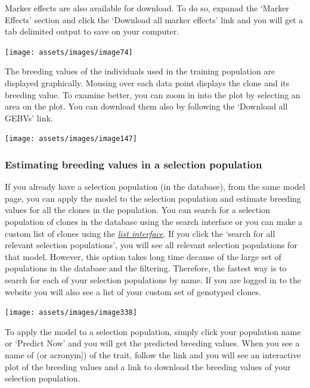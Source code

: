 \documentclass[
  12pt,
]{book}
\begin{document}
Marker effects are also available for download. To do so, expanad the `Marker Effects' section and click the `Download all marker effects' link and you will get a tab delimited output to save on your computer.

\begin{center}\texttt{[image: assets/images/image74]} \end{center}

The breeding values of the individuals used in the training population are displayed graphically. Mousing over each data point displays the clone and its breeding value. To examine better, you can zoom in into the plot by selecting an area on the plot. You can download them also by following the `Download all GEBVs' link.

\begin{center}\texttt{[image: assets/images/image147]} \end{center}

\hypertarget{estimating-breeding-values-in-a-selection-population}{%
\subsubsection*{Estimating breeding values in a selection population}\label{estimating-breeding-values-in-a-selection-population}}


If you already have a selection population (in the database), from the same model page, you can apply the model to the selection population and estimate breeding values for all the clones in the population. You can search for a selection population of clones in the database using the search interface or you can make a custom list of clones using the \protect\hyperlink{working-with-lists}{\emph{list interface}}. If you click the `search for all relevant selection populations', you will see all relevant selection populations for that model. However, this option takes long time decause of the large set of populations in the database and the filtering. Therefore, the fastest way is to search for each of your selection populations by name. If you are logged in to the website you will also see a list of your custom set of genotyped clones.

\begin{center}\texttt{[image: assets/images/image338]} \end{center}

To apply the model to a selection population, simply click your population name or `Predict Now' and you will get the predicted breeding values. When you see a name of (or acronym{]}) of the trait, follow the link and you will see an interactive plot of the breeding values and a link to download the breeding values of your selection population.
\end{document}
